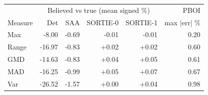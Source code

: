 \begin{tabular}{lrrrrr}\toprule
 & \multicolumn{4}{c}{Believed vs true (mean signed \%)} & PBOI \\
Measure & Det & SAA & SORTIE-0 & SORTIE-1 & max $|$err$|$ \% \\
\midrule
Max & -8.00 & -0.69 & -0.01 & -0.01 & 0.20 \\
Range & -16.97 & -0.83 & +0.02 & +0.02 & 0.60 \\
GMD & -14.63 & -0.83 & +0.04 & +0.05 & 0.61 \\
MAD & -16.25 & -0.99 & +0.05 & +0.07 & 0.67 \\
Var & -26.52 & -1.57 & +0.00 & +0.04 & 0.98 \\
\bottomrule
\end{tabular}
